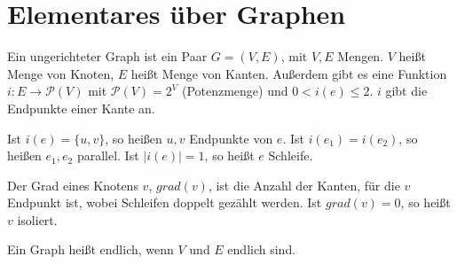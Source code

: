 
\section{Elementares über Graphen}


\begin{definition}
    
    Ein ungerichteter Graph ist ein Paar $G = (V,E)$, mit $V, E$ Mengen. $V$
    heißt Menge von Knoten, $E$ heißt Menge von Kanten. Außerdem gibt es eine
    Funktion $i: E \rightarrow \mathcal{P}(V)$ mit $\mathcal{P}(V) = 2^V$
    (Potenzmenge) und $0 < i(e) \leq 2$. $i$ gibt die Endpunkte einer Kante an.
    
    Ist $i(e) = \{ u, v \}$, so heißen $u, v$ Endpunkte von $e$. Ist $i(e_1)
    = i(e_2)$, so heißen $e_1, e_2$ parallel. Ist $|i(e)| = 1$, so heißt $e$
    Schleife.
    
    Der Grad eines Knotens $v$, $grad(v)$, ist die Anzahl der Kanten, für die
    $v$ Endpunkt ist, wobei Schleifen doppelt gezählt werden. Ist $grad(v)
    = 0$, so heißt $v$ isoliert.
    
    Ein Graph heißt endlich, wenn $V$ und $E$ endlich sind.
\end{definition}


